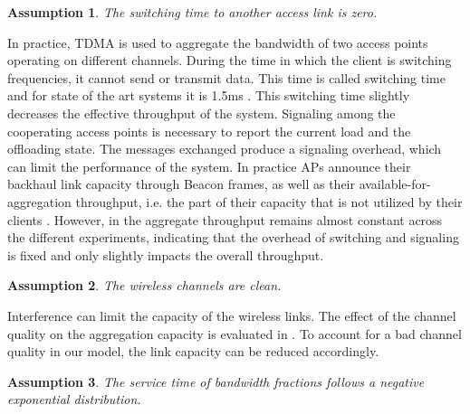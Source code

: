 

\newtheorem{amp1}{Assumption}\label{amp:switching}
\begin{amp1}
	The switching time to another access link is zero.
\end{amp1}
In practice, TDMA is used to aggregate the bandwidth of two access points operating on different channels.
During the time in which the client is switching frequencies, it cannot send or transmit data. This time is called switching time and for state of the art systems it is 1.5ms \cite{goma2013patent}.
This switching time slightly decreases the effective throughput of the system.
Signaling among the cooperating access points is necessary to report the current load and the offloading state.
The messages exchanged produce a signaling overhead, which can limit the performance of the system.
In practice APs announce their backhaul link capacity through Beacon frames, as well as their available-for-aggregation throughput, i.e. the part of their capacity that is not utilized by their clients \cite{goma2013patent}.
However, in \cite{goma2013patent} the aggregate throughput remains almost constant across the different experiments, indicating that the overhead of switching and signaling is fixed and only slightly impacts the overall throughput.
\newtheorem{amp2}[amp1]{Assumption}\label{amp:aggrlimit}
\begin{amp2}
	The wireless channels are clean.
\end{amp2}
Interference can limit the capacity of the wireless links.
The effect of the channel quality on the aggregation capacity is evaluated in \cite{goma2013patent}.
To account for a bad channel quality in our model, the link capacity can be reduced accordingly.

\newtheorem{amp3}[amp1]{Assumption}\label{amp:servicetimes}
\begin{amp3}
	The service time of bandwidth fractions follows a negative exponential distribution.
\end{amp3}

